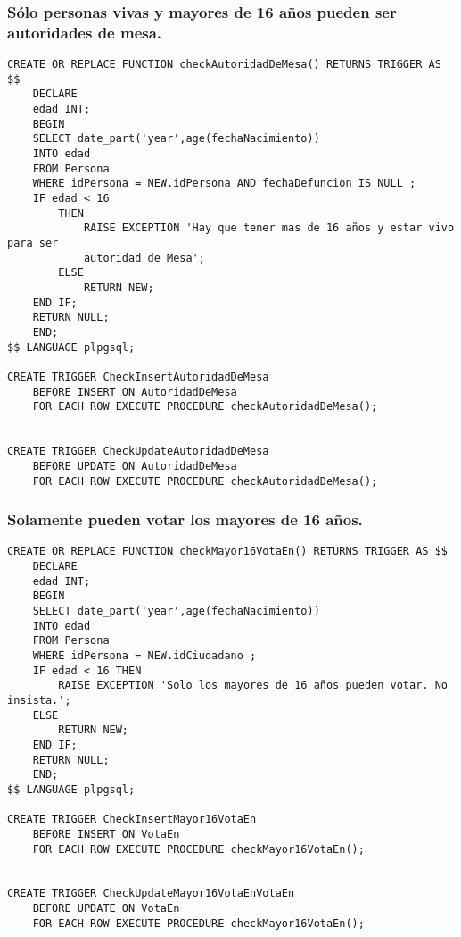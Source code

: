 \subsubsection{Sólo personas vivas y mayores de 16 años pueden ser autoridades de mesa.}
\begin{verbatim}
CREATE OR REPLACE FUNCTION checkAutoridadDeMesa() RETURNS TRIGGER AS $$
    DECLARE
    edad INT;
    BEGIN
    SELECT date_part('year',age(fechaNacimiento))  
    INTO edad 
    FROM Persona 
    WHERE idPersona = NEW.idPersona AND fechaDefuncion IS NULL ;
    IF edad < 16 
        THEN
            RAISE EXCEPTION 'Hay que tener mas de 16 años y estar vivo para ser 
            autoridad de Mesa';
        ELSE
            RETURN NEW;
    END IF;
    RETURN NULL;
    END;
$$ LANGUAGE plpgsql;

CREATE TRIGGER CheckInsertAutoridadDeMesa
    BEFORE INSERT ON AutoridadDeMesa
    FOR EACH ROW EXECUTE PROCEDURE checkAutoridadDeMesa();


CREATE TRIGGER CheckUpdateAutoridadDeMesa
    BEFORE UPDATE ON AutoridadDeMesa
    FOR EACH ROW EXECUTE PROCEDURE checkAutoridadDeMesa();
\end{verbatim}

\subsubsection{Solamente pueden votar los mayores de 16 años.}
\begin{verbatim}
CREATE OR REPLACE FUNCTION checkMayor16VotaEn() RETURNS TRIGGER AS $$
    DECLARE
    edad INT;
    BEGIN
    SELECT date_part('year',age(fechaNacimiento))
    INTO edad 
    FROM Persona 
    WHERE idPersona = NEW.idCiudadano ; 
    IF edad < 16 THEN
        RAISE EXCEPTION 'Solo los mayores de 16 años pueden votar. No insista.';
    ELSE
        RETURN NEW;
    END IF;
    RETURN NULL;
    END;
$$ LANGUAGE plpgsql;

CREATE TRIGGER CheckInsertMayor16VotaEn
    BEFORE INSERT ON VotaEn
    FOR EACH ROW EXECUTE PROCEDURE checkMayor16VotaEn();


CREATE TRIGGER CheckUpdateMayor16VotaEnVotaEn
    BEFORE UPDATE ON VotaEn
    FOR EACH ROW EXECUTE PROCEDURE checkMayor16VotaEn();
\end{verbatim}

